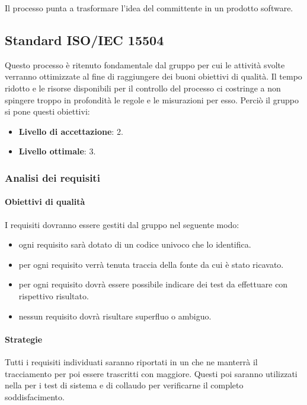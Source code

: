 Il processo punta a trasformare l'idea del committente in un prodotto software.

\subsection{Standard ISO/IEC 15504}
Questo processo è ritenuto fondamentale dal gruppo per cui le attività svolte verranno ottimizzate al fine di raggiungere dei buoni obiettivi di qualità. Il tempo ridotto e le risorse disponibili per il controllo del processo ci costringe a non spingere troppo in profondità le regole e le misurazioni per esso. Perciò il gruppo si pone questi obiettivi:
\begin{itemize}
\item \textbf{Livello di accettazione}: 2.
\item \textbf{Livello ottimale}: 3.
\end{itemize}

\subsubsection{Analisi dei requisiti}

\paragraph{Obiettivi di qualità}
I requisiti dovranno essere gestiti dal gruppo nel seguente modo:

\begin{itemize}
\item ogni requisito sarà dotato di un codice univoco che lo identifica.
\item per ogni requisito verrà tenuta traccia della fonte da cui è stato ricavato.
\item per ogni requisito dovrà essere possibile indicare dei test da effettuare con rispettivo risultato.
\item nessun requisito dovrà risultare superfluo o ambiguo.
\end{itemize}

\paragraph{Strategie}
Tutti i requisiti individuati saranno riportati in un  che ne manterrà il tracciamento per poi essere trascritti con maggiore. Questi poi saranno utilizzati nella per i test di sistema e di collaudo per verificarne il completo soddisfacimento.

